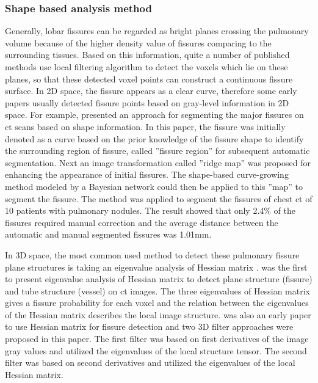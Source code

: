 \subsubsection{Shape based analysis method}
Generally, lobar fissures can be regarded as bright planes crossing the pulmonary volume because of the higher density value of fissures comparing to the surrounding tissues. Based on this information, quite a number of published methods use local filtering algorithm to detect the voxels which lie on these planes, so that these detected voxel points can construct a continuous fissure surface. In 2D space, the fissure appears as a clear curve, therefore some early papers usually detected fissure points based on gray-level information in 2D space. For example, \citep{wang2004shape,wang2006pulmonary} presented an approach for segmenting the major fissures on \gls{ct} scans based on shape information. In this paper, the fissure was initially denoted as a curve based on the prior knowledge of the fissure shape to identify the surrounding region of fissure, called ''fissure region'' for subsequent automatic segmentation. Next an image transformation called ''ridge map'' was proposed for enhancing the appearance of initial fissures. The shape-based curve-growing method modeled by a Bayesian network could then be applied to this ''map'' to segment the fissure. The method was applied to segment the fissures of chest \gls{ct} of 10 patients with pulmonary nodules. The result showed that only 2.4\% of the fissures required manual correction and the average distance between the automatic and manual segmented fissures was 1.01mm.

In 3D space, the most common used method to detect these pulmonary fissure plane structures is taking an eigenvalue analysis of Hessian matrix \citep{frangi1998multiscale,wiemker2005unsupervised,kitasaka2006recognition,ochs2007automated,van2008supervised,lassen2011interactive,lassen2013automatic,ross2010automatic,doel2012pulmonary}. \cite{frangi1998multiscale} was the first to present eigenvalue analysis of Hessian matrix to detect plane structure (fissure) and tube structure (vessel) on \gls{ct} images. The three eigenvalues of Hessian matrix gives a fissure probability for each voxel and the relation between the eigenvalues of the Hessian matrix describes the local image structure. \cite{wiemker2005unsupervised} was also an early paper to use Hessian matrix for fissure detection and two 3D filter approaches were proposed in this paper. The first filter was based on first derivatives of the image gray values and utilized the eigenvalues of the local structure tensor. The second filter was based on second derivatives and utilized the eigenvalues of the local Hessian matrix. 

